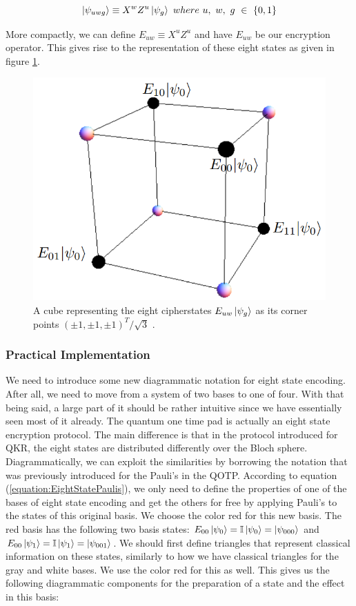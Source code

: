 \documentclass[]{article}
\begin{document}
\begin{equation}
	\label{equation:EightStatePaulis}
	\ket{\psi_{uwg}} \equiv X^w Z^u\ket{\psi_{g}}~where~ u,~ w,~ g~ \in~ \{0,1\}
\end{equation}

More compactly, we can define $E_{uw} \equiv X^u Z^u$ and have $E_{uw}$ be our encryption operator. This gives rise to the representation of these eight states as given in figure \ref{fig:eightstatecube}.

\begin{center}
\begin{figure}
	\begin{center}
	\includegraphics[width=0.5\linewidth]{Eightstatecube.png}
	\caption{A cube representing the eight cipherstates $E_{uw}\ket{\psi_{g}}$ as its corner points $(\pm1,\pm1,\pm1)^T/\sqrt{3}$ \cite{DeVries2016}.}
	\label{fig:eightstatecube}
	\end{center}
\end{figure}
\end{center}

\subsubsection{Practical Implementation}
We need to introduce some new diagrammatic notation for eight state encoding. After all, we need to move from a system of two bases to one of four. With that being said, a large part of it should be rather intuitive since we have essentially seen most of it already. The quantum one time pad is actually an eight state encryption protocol. The main difference is that in the protocol introduced for QKR, the eight states are distributed differently over the Bloch sphere. Diagrammatically, we can exploit the similarities by borrowing the notation that was previously introduced for the Pauli's in the QOTP. According to equation (\ref{equation:EightStatePaulis}), we only need to define the properties of one of the bases of eight state encoding and get the others for free by applying Pauli's to the states of this original basis. We choose the color red for this new basis. The red basis has the following two basis states: $E_{00}\ket{\psi_{0}} = \mathbb{I}\ket{\psi_{0}} = \ket{\psi_{000}}$ and $E_{00}\ket{\psi_{1}} = \mathbb{I}\ket{\psi_{1}} = \ket{\psi_{001}}$. We should first define triangles that represent classical information on these states, similarly to how we have classical triangles for the gray and white bases. We use the color red for this as well. This gives us the following diagrammatic components for the preparation of a state and the effect in this basis:
\end{document}

